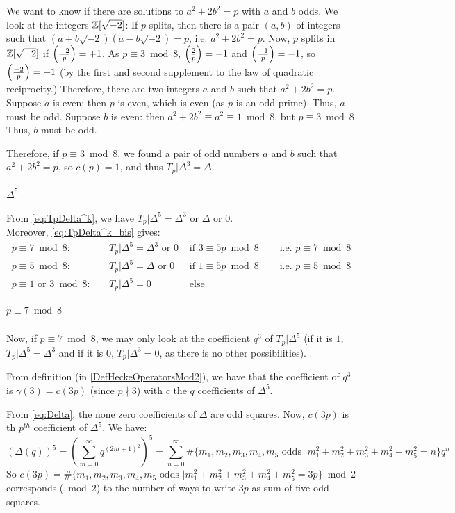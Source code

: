 We want to know if there are solutions to $a^2+2b^2=p$ with $a$ and $b$ odds.
We look at the integers $\mathbb{Z}[\sqrt{-2}]$:
If $p$ splits, then there is a pair $(a,b)$ of integers such that $(a+b\sqrt{-2})(a-b\sqrt{-2})=p$, i.e. $a^2+2b^2=p$.
Now, $p$ splits in $\mathbb{Z}[\sqrt{-2}]$ if $\left( \frac{-2}{p} \right)=+1$.
As $p \equiv 3 \bmod 8$, $\left( \frac{2}{p} \right)=-1$ and $\left( \frac{-1}{p} \right)=-1$, so $\left( \frac{-2}{p} \right)=+1$ (by the first and second supplement to the law of quadratic reciprocity.)
Therefore, there are two integers $a$ and $b$ such that $a^2+2b^2=p$.
Suppose $a$ is even: then $p$ is even, which is even (as $p$ is an odd prime).
Thus, $a$ must be odd.
Suppose $b$ is even: then $a^2+2b^2 \equiv a^2 \equiv 1 \bmod 8$, but $p \equiv 3 \bmod 8$
Thus, $b$ must be odd.

Therefore, if $p \equiv 3 \bmod 8$, we found a pair of odd numbers $a$ and $b$ such that $a^2+2b^2=p$, so $c(p)=1$, and thus $T_p|\Delta^3 = \Delta$.

\paragraph{$\Delta^5$}
From \eqref{eq:TpDelta^k}, we have $T_p|\Delta^5 = \Delta^3 \text{ or } \Delta \text{ or } 0$.\\
Moreover, \eqref{eq:TpDelta^k_bis} gives:
\begin{align*}
	p \equiv 7 \bmod 8: & \quad T_p|\Delta^5 = \Delta^3 \text{ or } 0 & \text{ if } 3 \equiv 5p \bmod 8 & \quad \text{ i.e. } p \equiv 7 \bmod 8 \\
	p \equiv 5 \bmod 8: & \quad T_p|\Delta^5 = \Delta \text{ or } 0 & \text{ if } 1 \equiv 5p \bmod 8 & \quad \text{ i.e. } p \equiv 5 \bmod 8 \\
	p \equiv 1 \text{ or } 3 \bmod 8: & \quad T_p|\Delta^5 = 0 & \text{ else } &
\end{align*}

\subparagraph{$p \equiv 7 \bmod 8$}
Now, if $p \equiv 7 \bmod 8$, we may only look at the coefficient $q^3$ of $T_p|\Delta^5$ (if it is $1$, $T_p|\Delta^5 = \Delta^3$ and if it is $0$, $T_p|\Delta^3 = 0$, as there is no other possibilities).

From definition (in \ref{DefHeckeOperatorsMod2}), we have that the coefficient of $q^3$ is $\gamma(3) = c(3p)$ (since $p \nmid 3$) with $c$ the $q$ coefficients of $\Delta^5$.

From \eqref{eq:Delta}, the none zero coefficients of $\Delta$ are odd squares.
Now, $c(3p)$ is th $p^{th}$ coefficient of $\Delta^5$. We have:
$$
\left( \Delta(q) \right)^5
= \left( \sum_{m=0}^{\infty} q^{(2m+1)^2} \right)^5
= \sum_{n=0}^{\infty} \#\{m_1, m_2, m_3, m_4, m_5 \text{ odds } | m_1^2 + m_2^2 + m_3^2 + m_4^2 + m_5^2 = n\} q^n
$$
So $c(3p) = \#\{m_1, m_2, m_3, m_4, m_5 \text{ odds } | m_1^2 + m_2^2 + m_3^2 + m_4^2 + m_5^2 = 3p\} \bmod 2$ corresponds ($\bmod 2$) to the number of ways to write $3p$ as sum of five odd squares.

